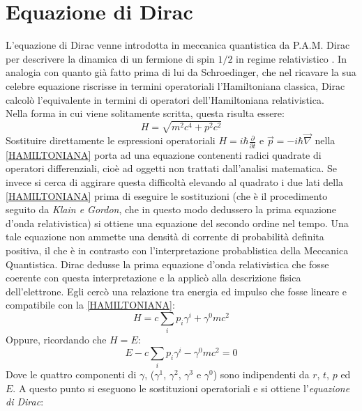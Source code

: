 
  
\chapter{Equazione di Dirac}%
\noindent
L'equazione di Dirac venne introdotta in meccanica quantistica da P.A.M. Dirac per descrivere la dinamica di un fermione di spin $1/2$ in regime relativistico \cite{Dirac}.
In analogia con quanto gi\`{a} fatto prima di lui da Schroedinger, che nel ricavare la sua celebre equazione riscrisse in termini operatoriali l'Hamiltoniana classica, Dirac 
calcol\`{o} l'equivalente in termini di operatori dell'Hamiltoniana relativistica.\\Nella forma in cui viene solitamente scritta, questa risulta essere:
\begin{equation}\label{HAMILTONIANA}
H = \sqrt{m^{2}c^{4}+p^{2}c^{2}}
\end{equation}
Sostituire direttamente le espressioni operatoriali $H=i\hbar\frac{\partial}{\partial t}$ e $\vec{p}=-i\hbar \vec{\nabla}$ nella 
\eqref{HAMILTONIANA} porta ad una equazione contenenti radici quadrate di operatori differenziali, cioè ad oggetti non trattati dall'analisi
matematica. Se invece si cerca di aggirare questa difficoltà elevando al quadrato i due lati della \eqref{HAMILTONIANA} prima
di eseguire le sostituzioni (che è il procedimento seguito da \emph{Klain e Gordon}, che in questo modo dedussero la prima equazione d'onda relativistica)
si ottiene una equazione del secondo ordine nel tempo. Una tale equazione non ammette una densità di corrente di probabilità definita positiva, il che è in contrasto con l'interpretazione probablistica della Meccanica Quantistica.
Dirac dedusse la prima equazione d'onda relativistica che fosse coerente con questa interpretazione e la applicò alla descrizione fisica 
dell'elettrone.
Egli cercò una relazione tra energia ed impulso che fosse lineare e compatibile con la \eqref{HAMILTONIANA}:
\begin{equation}
 H = c\sum_i p_i\gamma^i + \gamma^0 mc^2
\end{equation}
Oppure, ricordando che $H = E$:
\begin{equation} \label{k}
 E - c\sum_i p_i\gamma^i - \gamma^0 mc^2 = 0
\end{equation}
Dove le quattro componenti di $\gamma$, ($\gamma^1$, $\gamma^2$, $\gamma^3$ e $\gamma^0$) sono indipendenti da ${r}$, $t$, 
${p}$ ed $E$.
A questo punto si eseguono le sostituzioni operatoriali e si ottiene l'\emph{equazione di Dirac}:
